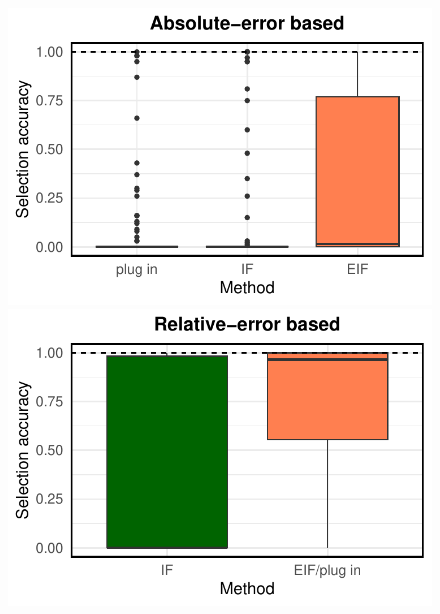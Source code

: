 \documentclass[twoside]{article}
\newcommand{\1}{{\mathbbm{1}}}
\begin{document}
\begin{figure}[ht]
\begin{minipage}{0.23\textwidth}
                \centering
                \includegraphics[clip, trim = 0cm 0cm 0cm 0cm, width = \textwidth]{plot/ACIC_linear_propensity_nonlinear_HTE_selection_accuracy_absolute_error.pdf}
        \end{minipage}
            \begin{minipage}{0.23\textwidth}
                \centering
                \includegraphics[clip, trim = 0cm 0cm 0cm 0cm, width = \textwidth]{plot/ACIC_linear_propensity_nonlinear_HTE_selection_accuracy_relative_error.pdf}
        \end{minipage}
         \\
                \begin{minipage}{0.23\textwidth}
                \centering

\end{minipage}
\end{figure}
\end{document}
